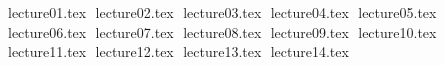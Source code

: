 \documentclass[12pt,letterpaper]{report}
\theoremstyle{definition}
\begin{document}
\newpage
\pagestyle{plain}
\fi
\tableofcontents
\newpage
\begin{normalsize}
{lecture01.tex}
$ $
{lecture02.tex}
$ $
{lecture03.tex}
$ $
{lecture04.tex}
$ $
{lecture05.tex}
$ $
{lecture06.tex}
$ $
{lecture07.tex}
$ $
{lecture08.tex}
$ $
{lecture09.tex}
$ $
{lecture10.tex}
$ $
{lecture11.tex}
$ $
{lecture12.tex}
$ $
{lecture13.tex}
$ $
{lecture14.tex}
$ $
\end{normalsize}
\end{document}
